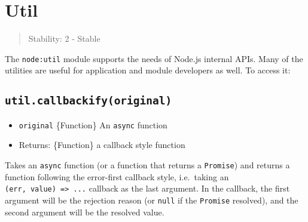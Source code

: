 \section{Util}\label{util}

\begin{quote}
Stability: 2 - Stable
\end{quote}

The \texttt{node:util} module supports the needs of Node.js internal
APIs. Many of the utilities are useful for application and module
developers as well. To access it:

\begin{Shaded}
\begin{Highlighting}[]
\OperatorTok{=} \NormalTok{(}\NormalTok{)}\OperatorTok{;}
\end{Highlighting}
\end{Shaded}

\subsection{\texorpdfstring{\texttt{util.callbackify(original)}}{util.callbackify(original)}}\label{util.callbackifyoriginal}

\begin{itemize}
\tightlist
\item
  \texttt{original} \{Function\} An \texttt{async} function
\item
  Returns: \{Function\} a callback style function
\end{itemize}

Takes an \texttt{async} function (or a function that returns a
\texttt{Promise}) and returns a function following the error-first
callback style, i.e.~taking an
\texttt{(err,\ value)\ =\textgreater{}\ ...} callback as the last
argument. In the callback, the first argument will be the rejection
reason (or \texttt{null} if the \texttt{Promise} resolved), and the
second argument will be the resolved value.

